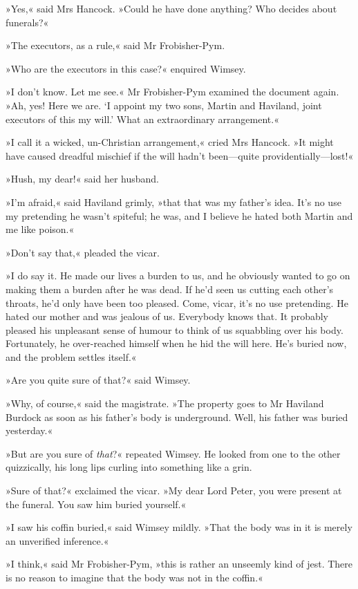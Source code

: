 »Yes,« said Mrs Hancock. »Could he have done anything? Who decides about funerals?«

»The executors, as a rule,« said Mr Frobisher-Pym.

»Who are the executors in this case?« enquired Wimsey.

»I don't know. Let me see.« Mr Frobisher-Pym examined the document again. »Ah, yes! Here we are. `I appoint my two sons, Martin and Haviland, joint executors of this my will.' What an extraordinary arrangement.«

»I call it a wicked, un-Christian arrangement,« cried Mrs Hancock. »It might have caused dreadful mischief if the will hadn't been—quite providentially—lost!«

»Hush, my dear!« said her husband.

»I'm afraid,« said Haviland grimly, »that that was my father's idea. It's no use my pretending he wasn't spiteful; he was, and I believe he hated both Martin and me like poison.«

»Don't say that,« pleaded the vicar.

»I do say it. He made our lives a burden to us, and he obviously wanted to go on making them a burden after he was dead. If he'd seen us cutting each other's throats, he'd only have been too pleased. Come, vicar, it's no use pretending. He hated our mother and was jealous of us. Everybody knows that. It probably pleased his unpleasant sense of humour to think of us squabbling over his body. Fortunately, he over-reached himself when he hid the will here. He's buried now, and the problem settles itself.«

»Are you quite sure of that?« said Wimsey.

»Why, of course,« said the magistrate. »The property goes to Mr Haviland Burdock as soon as his father's body is underground. Well, his father was buried yesterday.«

»But are you sure of \textit{that}?« repeated Wimsey. He looked from one to the other quizzically, his long lips curling into something like a grin.

»Sure of that?« exclaimed the vicar. »My dear Lord Peter, you were present at the funeral. You saw him buried yourself.«

»I saw his coffin buried,« said Wimsey mildly. »That the body was in it is merely an unverified inference.«

»I think,« said Mr Frobisher-Pym, »this is rather an unseemly kind of jest. There is no reason to imagine that the body was not in the coffin.«

